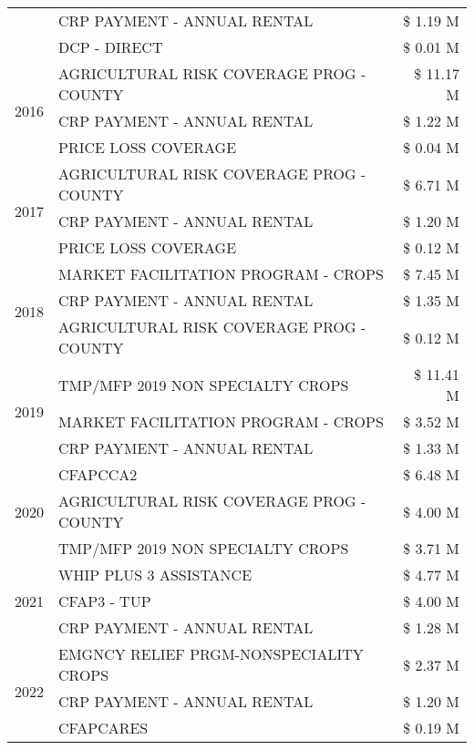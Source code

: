 \begin{tabular}{llr}
 & CRP PAYMENT - ANNUAL RENTAL & \$ 1.19 M \\
 & DCP - DIRECT & \$ 0.01 M \\
\cline{1-3}
\multirow[t]{3}{*}{2016} & AGRICULTURAL RISK COVERAGE PROG - COUNTY & \$ 11.17 M \\
 & CRP PAYMENT - ANNUAL RENTAL & \$ 1.22 M \\
 & PRICE LOSS COVERAGE & \$ 0.04 M \\
\cline{1-3}
\multirow[t]{3}{*}{2017} & AGRICULTURAL RISK COVERAGE PROG - COUNTY & \$ 6.71 M \\
 & CRP PAYMENT - ANNUAL RENTAL & \$ 1.20 M \\
 & PRICE LOSS COVERAGE & \$ 0.12 M \\
\cline{1-3}
\multirow[t]{3}{*}{2018} & MARKET FACILITATION PROGRAM - CROPS & \$ 7.45 M \\
 & CRP PAYMENT - ANNUAL RENTAL & \$ 1.35 M \\
 & AGRICULTURAL RISK COVERAGE PROG - COUNTY & \$ 0.12 M \\
\cline{1-3}
\multirow[t]{3}{*}{2019} & TMP/MFP 2019 NON SPECIALTY CROPS & \$ 11.41 M \\
 & MARKET FACILITATION PROGRAM - CROPS & \$ 3.52 M \\
 & CRP PAYMENT - ANNUAL RENTAL & \$ 1.33 M \\
\cline{1-3}
\multirow[t]{3}{*}{2020} & CFAPCCA2 & \$ 6.48 M \\
 & AGRICULTURAL RISK COVERAGE PROG - COUNTY & \$ 4.00 M \\
 & TMP/MFP 2019 NON SPECIALTY CROPS & \$ 3.71 M \\
\cline{1-3}
\multirow[t]{3}{*}{2021} & WHIP PLUS 3 ASSISTANCE & \$ 4.77 M \\
 & CFAP3 - TUP & \$ 4.00 M \\
 & CRP PAYMENT - ANNUAL RENTAL & \$ 1.28 M \\
\cline{1-3}
\multirow[t]{3}{*}{2022} & EMGNCY RELIEF PRGM-NONSPECIALITY CROPS & \$ 2.37 M \\
 & CRP PAYMENT - ANNUAL RENTAL & \$ 1.20 M \\
 & CFAPCARES & \$ 0.19 M \\
\cline{1-3}
\bottomrule
\end{tabular}
